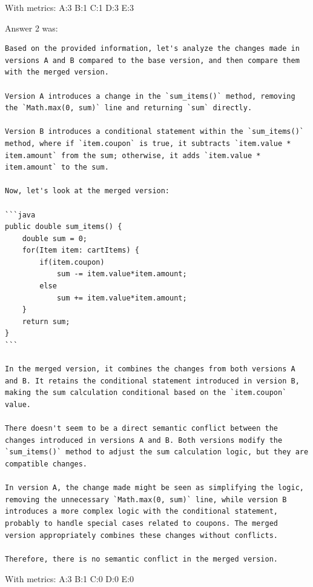 With metrics:
A:3
B:1
C:1
D:3
E:3

Answer 2 was:
\begin{lstlisting}
Based on the provided information, let's analyze the changes made in versions A and B compared to the base version, and then compare them with the merged version.

Version A introduces a change in the `sum_items()` method, removing the `Math.max(0, sum)` line and returning `sum` directly.

Version B introduces a conditional statement within the `sum_items()` method, where if `item.coupon` is true, it subtracts `item.value * item.amount` from the sum; otherwise, it adds `item.value * item.amount` to the sum.

Now, let's look at the merged version:

```java
public double sum_items() {
    double sum = 0;
    for(Item item: cartItems) {
        if(item.coupon)
            sum -= item.value*item.amount;
        else
            sum += item.value*item.amount;
    }
    return sum;
}
```

In the merged version, it combines the changes from both versions A and B. It retains the conditional statement introduced in version B, making the sum calculation conditional based on the `item.coupon` value.

There doesn't seem to be a direct semantic conflict between the changes introduced in versions A and B. Both versions modify the `sum_items()` method to adjust the sum calculation logic, but they are compatible changes.

In version A, the change made might be seen as simplifying the logic, removing the unnecessary `Math.max(0, sum)` line, while version B introduces a more complex logic with the conditional statement, probably to handle special cases related to coupons. The merged version appropriately combines these changes without conflicts.

Therefore, there is no semantic conflict in the merged version.
\end{lstlisting}

With metrics:
A:3
B:1
C:0
D:0
E:0


